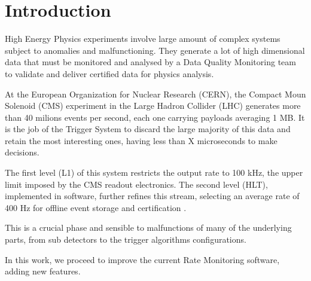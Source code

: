 \chapter{Introduction}

High Energy Physics experiments involve large amount of complex systems subject to anomalies and malfunctioning. They generate a lot of high dimensional data that must be monitored and analysed by a Data Quality Monitoring team to validate and deliver certified data for physics analysis.

At the European Organization for Nuclear Research (CERN), the Compact Moun Solenoid (CMS) experiment in the Large Hadron Collider (LHC) generates more than 40 milions events per second, each one carrying payloads averaging 1 MB. It is the job of the Trigger System to discard the large majority of this data and retain the most interesting ones, having less than X microseconds to make decisions. 

The first level (L1) of this system restricts the output rate to 100 kHz, the upper limit imposed by the CMS readout electronics. The second level (HLT), implemented in software, further refines this stream, selecting an average rate of 400 Hz for offline event storage and certification \cite{Khachatryan_2017}.

This is a crucial phase and sensible to malfunctions of many of the underlying parts, from sub detectors to the trigger algorithms configurations.

In this work, we proceed to improve the current Rate Monitoring software, adding new features.

